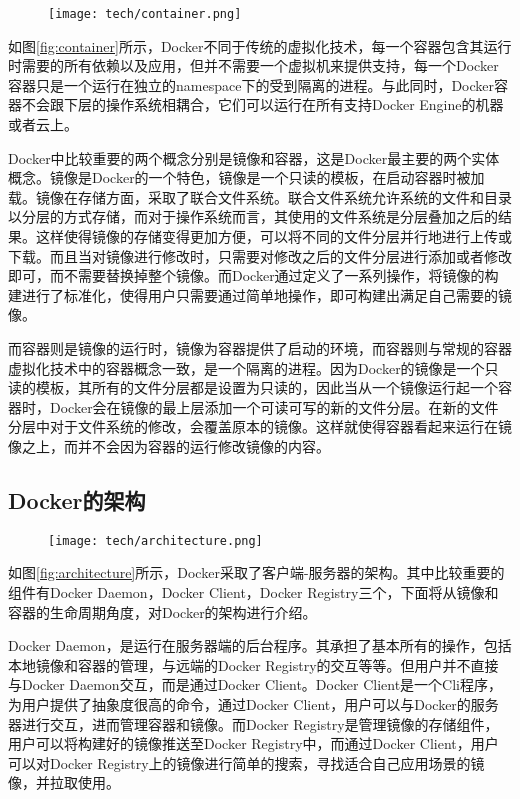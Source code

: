 \begin{figure}[!htp]
  \centering
  \texttt{[image: tech/container.png]}
\end{figure}

如图\ref{fig:container}所示，Docker不同于传统的虚拟化技术，每一个容器包含其运行时需要的所有依赖以及应用，但并不需要一个虚拟机来提供支持，每一个Docker容器只是一个运行在独立的namespace下的受到隔离的进程。与此同时，Docker容器不会跟下层的操作系统相耦合，它们可以运行在所有支持Docker Engine的机器或者云上。

Docker中比较重要的两个概念分别是镜像和容器，这是Docker最主要的两个实体概念。镜像是Docker的一个特色，镜像是一个只读的模板，在启动容器时被加载。镜像在存储方面，采取了联合文件系统。联合文件系统允许系统的文件和目录以分层的方式存储，而对于操作系统而言，其使用的文件系统是分层叠加之后的结果。这样使得镜像的存储变得更加方便，可以将不同的文件分层并行地进行上传或下载。而且当对镜像进行修改时，只需要对修改之后的文件分层进行添加或者修改即可，而不需要替换掉整个镜像。而Docker通过定义了一系列操作，将镜像的构建进行了标准化，使得用户只需要通过简单地操作，即可构建出满足自己需要的镜像。\cite{mayue}

而容器则是镜像的运行时，镜像为容器提供了启动的环境，而容器则与常规的容器虚拟化技术中的容器概念一致，是一个隔离的进程。因为Docker的镜像是一个只读的模板，其所有的文件分层都是设置为只读的，因此当从一个镜像运行起一个容器时，Docker会在镜像的最上层添加一个可读可写的新的文件分层。在新的文件分层中对于文件系统的修改，会覆盖原本的镜像。这样就使得容器看起来运行在镜像之上，而并不会因为容器的运行修改镜像的内容。

\subsection{Docker的架构}

\begin{figure}[!htp]
  \centering
  \texttt{[image: tech/architecture.png]}
\end{figure}

如图\ref{fig:architecture}所示，Docker采取了客户端-服务器的架构。其中比较重要的组件有Docker Daemon，Docker Client，Docker Registry三个，下面将从镜像和容器的生命周期角度，对Docker的架构进行介绍。

Docker Daemon，是运行在服务器端的后台程序。其承担了基本所有的操作，包括本地镜像和容器的管理，与远端的Docker Registry的交互等等。但用户并不直接与Docker Daemon交互，而是通过Docker Client。Docker Client是一个Cli程序，为用户提供了抽象度很高的命令，通过Docker Client，用户可以与Docker的服务器进行交互，进而管理容器和镜像。而Docker Registry是管理镜像的存储组件，用户可以将构建好的镜像推送至Docker Registry中，而通过Docker Client，用户可以对Docker Registry上的镜像进行简单的搜索，寻找适合自己应用场景的镜像，并拉取使用。

